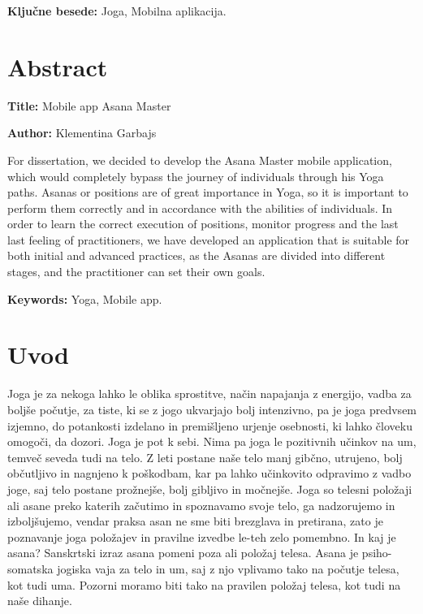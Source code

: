 \documentclass[a4paper, 12pt]{book}
\newcommand{\ttitleEn}{Mobile app Asana Master}
\newcommand{\tauthor}{Klementina Garbajs}
\newcommand{\tkeywords}{Joga, Mobilna aplikacija}
\newcommand{\tkeywordsEn}{Yoga, Mobile app}
\newcommand{\clearemptydoublepage}{\newpage{\pagestyle{empty}\cleardoublepage}}
\begin{document}
\bigskip

\noindent\textbf{Ključne besede:} \tkeywords.
\clearemptydoublepage

\chapter*{Abstract}

\noindent\textbf{Title:} \ttitleEn
\bigskip

\noindent\textbf{Author:} \tauthor
\bigskip

\noindent 

For dissertation, we decided to develop the Asana Master mobile application, which would completely bypass the journey of individuals through his Yoga paths. Asanas or  positions are of great importance in Yoga, so it is important to perform them correctly and in accordance with the abilities of individuals. In order to learn the correct execution of positions, monitor progress and the last last feeling of practitioners, we have developed an application that is suitable for both initial and advanced practices, as the Asanas are divided into different stages, and the practitioner can set their own goals.
\bigskip

\noindent\textbf{Keywords:} \tkeywordsEn.
\clearemptydoublepage

\mainmatter
\setcounter{page}{1}
\pagestyle{fancy}

\chapter{Uvod}
Joga je za nekoga lahko le oblika sprostitve, način napajanja z energijo, vadba za boljše počutje, za tiste, ki se z jogo ukvarjajo bolj intenzivno, pa je joga predvsem izjemno, do potankosti izdelano in premišljeno urjenje osebnosti, ki lahko človeku omogoči, da dozori. Joga je pot k sebi. Nima pa joga le pozitivnih učinkov na um, temveč seveda tudi na telo. 
Z leti postane naše telo manj gibčno, utrujeno, bolj občutljivo in nagnjeno k poškodbam, kar pa lahko učinkovito odpravimo z vadbo joge, saj telo postane prožnejše, bolj gibljivo in močnejše. Joga so telesni položaji ali asane preko katerih začutimo in spoznavamo svoje telo, ga nadzorujemo in izboljšujemo, vendar praksa asan ne sme biti brezglava in pretirana, zato je poznavanje joga položajev in pravilne izvedbe le-teh zelo pomembno. 
In kaj je asana? Sanskrtski izraz asana pomeni poza ali položaj telesa. Asana je psiho-somatska jogiska vaja za telo in um, saj z njo vplivamo tako na počutje telesa, kot tudi uma. Pozorni moramo biti tako na pravilen položaj telesa, kot tudi na naše dihanje. 
\end{document}
